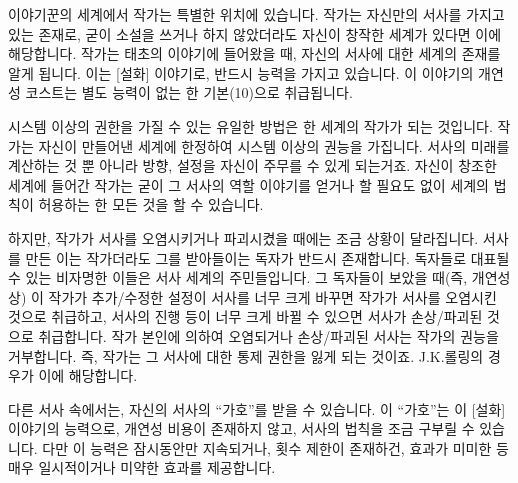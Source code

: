 \documentclass{report}
\begin{document}
	
	이야기꾼의 세계에서 작가는 특별한 위치에 있습니다. 작가는 자신만의 서사를 가지고 있는 존재로, 굳이 소설을 쓰거나 하지 않았더라도 자신이 창작한 세계가 있다면 이에 해당합니다.
	작가는 태초의 이야기에 들어왔을 때, 자신의 서사에 대한 세계의 존재를 알게 됩니다. 이는 [설화] 이야기로, 반드시 능력을 가지고 있습니다. 이 이야기의 개연성 코스트는 별도 능력이 없는 한 기본(10)으로 취급됩니다.
	
	시스템 이상의 권한을 가질 수 있는 유일한 방법은 한 세계의 작가가 되는 것입니다. 작가는 자신이 만들어낸 세계에 한정하여 시스템 이상의 권능을 가집니다. 서사의 미래를 계산하는 것 뿐 아니라 방향, 설정을 자신이 주무를 수 있게 되는거죠. 자신이 창조한 세계에 들어간 작가는 굳이 그 서사의 역할 이야기를 얻거나 할 필요도 없이 세계의 법칙이 허용하는 한 모든 것을 할 수 있습니다.
	
	하지만, 작가가 서사를 오염시키거나 파괴시켰을 때에는 조금 상황이 달라집니다. 서사를 만든 이는 작가더라도 그를 받아들이는 독자가 반드시 존재합니다. 독자들로 대표될 수 있는 비자명한 이들은 서사 세계의 주민들입니다. 그 독자들이 보았을 때(즉, 개연성상) 이 작가가 추가/수정한 설정이 서사를 너무 크게 바꾸면 작가가 서사를 오염시킨 것으로 취급하고, 서사의 진행 등이 너무 크게 바뀔 수 있으면 서사가 손상/파괴된 것으로 취급합니다.
	작가 본인에 의하여 오염되거나 손상/파괴된 서사는 작가의 권능을 거부합니다. 즉, 작가는 그 서사에 대한 통제 권한을 잃게 되는 것이죠. \ifDLC J.K.롤링의 경우가 이에 해당합니다.\fi
	
	다른 서사 속에서는, 자신의 서사의 “가호”를 받을 수 있습니다. 이 “가호”는 이 [설화] 이야기의 능력으로, 개연성 비용이 존재하지 않고, 서사의 법칙을 조금 구부릴 수 있습니다. 다만 이 능력은 잠시동안만 지속되거나, 횟수 제한이 존재하건, 효과가 미미한 등 매우 일시적이거나 미약한 효과를 제공합니다.
\end{document}
